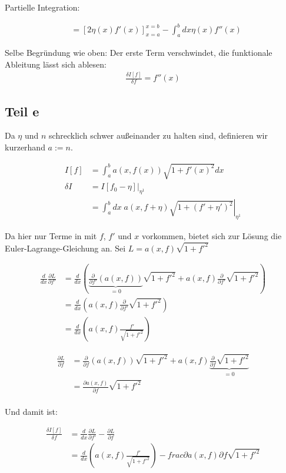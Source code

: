 \documentclass[a4paper,german,12pt,smallheadings]{scrartcl}
\begin{document}
Partielle Integration:

\begin{align*}
  &=\left[2\eta(x) f'(x)\right]_{x=a}^{x=b} - \int_a^b dx \eta(x) f''(x)
\end{align*}

Selbe Begründung wie oben: Der erste Term verschwindet, die funktionale Ableitung lässt sich ablesen:
\begin{align*}
  \frac{\delta I[f]}{\delta f} = f''(x)
\end{align*}

\subsection*{Teil e}
Da $\eta$ und $n$ schrecklich schwer außeinander zu halten sind,
definieren wir kurzerhand $a := n$.

\begin{align*}
  I[f] &= \int_a^b a(x,f(x)) \sqrt{1+f'(x)^2} dx \\
  \delta I &= \left.I[f_0 - \eta]\right|_{\eta^1} \\
  &=\left.\int_a^b dx \; a(x, f + \eta) \sqrt{1+(f'+\eta')^2} \right|_{\eta^1}
\end{align*}

Da hier nur Terme in mit $f$, $f'$ und $x$ vorkommen, bietet sich zur Lösung
die Euler-Lagrange-Gleichung an. Sei $L = a(x, f) \sqrt{1+f'^2}$

\begin{align*}
  \frac{d}{dx} \frac{\partial L}{\partial f'} &= \frac{d}{dx} \left(\underbrace{\frac{\partial}{\partial f'} (a(x, f))}_{=0} \sqrt{1+f'^2} + a(x,f) \frac{\partial}{\partial f'} \sqrt{1+f'^2} \right) \\
  &= \frac{d}{dx} \left(a(x,f) \frac{\partial}{\partial f'} \sqrt{1+f'^2} \right) \\
  &= \frac{d}{dx} \left(a(x,f) \frac{f'}{\sqrt{1+f'^2}} \right)
\end{align*}

\begin{align*}
  \frac{\partial L}{\partial f} &= \frac{\partial}{\partial f} \left(a(x, f)\right) \sqrt{1+f'^2} + a(x, f) \underbrace{\frac{\partial}{\partial f} \sqrt{1+f'^2}}_{=0} \\
  &= \frac{\partial a(x,f)}{\partial f} \sqrt{1+f'^2} \\
\end{align*}

Und damit ist:

\begin{align*}
  \frac{\delta I[f]}{\delta f} &= \frac{d}{dx} \frac{\partial L}{\partial f'} - \frac{\partial L}{\partial f} \\
  &= \frac{d}{dx} \left(a(x,f) \frac{f'}{\sqrt{1+f'^2}} \right) - frac{\partial a(x,f)}{\partial f} \sqrt{1+f'^2}
\end{align*}
\end{document}
